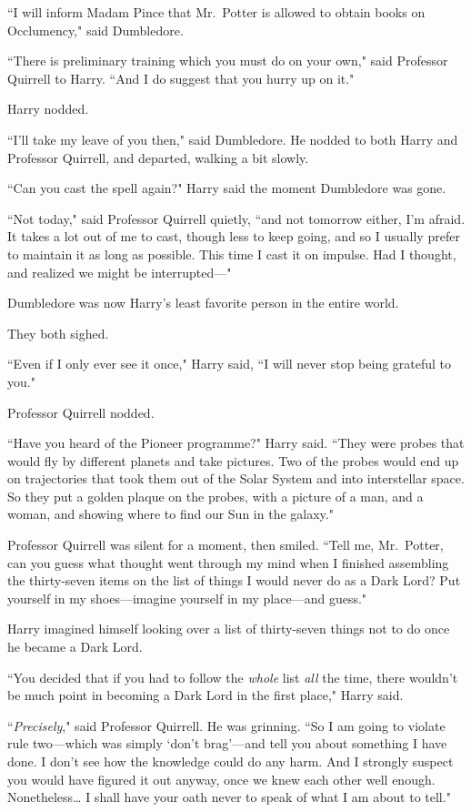 ``I will inform Madam Pince that Mr.~Potter is allowed to obtain books on Occlumency," said Dumbledore.

``There is preliminary training which you must do on your own," said Professor Quirrell to Harry. ``And I do suggest that you hurry up on it."

Harry nodded.

``I'll take my leave of you then," said Dumbledore. He nodded to both Harry and Professor Quirrell, and departed, walking a bit slowly.

``Can you cast the spell again?" Harry said the moment Dumbledore was gone.

``Not today," said Professor Quirrell quietly, ``and not tomorrow either, I'm afraid. It takes a lot out of me to cast, though less to keep going, and so I usually prefer to maintain it as long as possible. This time I cast it on impulse. Had I thought, and realized we might be interrupted—"

Dumbledore was now Harry's least favorite person in the entire world.

They both sighed.

``Even if I only ever see it once," Harry said, ``I will never stop being grateful to you."

Professor Quirrell nodded.

``Have you heard of the Pioneer programme?" Harry said. ``They were probes that would fly by different planets and take pictures. Two of the probes would end up on trajectories that took them out of the Solar System and into interstellar space. So they put a golden plaque on the probes, with a picture of a man, and a woman, and showing where to find our Sun in the galaxy."

Professor Quirrell was silent for a moment, then smiled. ``Tell me, Mr.~Potter, can you guess what thought went through my mind when I finished assembling the thirty-seven items on the list of things I would never do as a Dark Lord? Put yourself in my shoes—imagine yourself in my place—and guess."

Harry imagined himself looking over a list of thirty-seven things not to do once he became a Dark Lord.

``You decided that if you had to follow the \emph{whole} list \emph{all} the time, there wouldn't be much point in becoming a Dark Lord in the first place," Harry said.

``\emph{Precisely}," said Professor Quirrell. He was grinning. ``So I am going to violate rule two—which was simply `don't brag'—and tell you about something I have done. I don't see how the knowledge could do any harm. And I strongly suspect you would have figured it out anyway, once we knew each other well enough. Nonetheless{\ldots} I shall have your oath never to speak of what I am about to tell."

